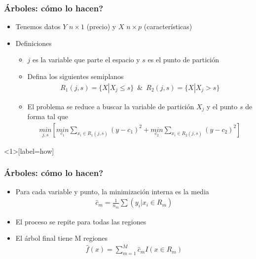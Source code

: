 \documentclass[
  shownotes,
  xcolor={svgnames},
  hyperref={colorlinks,citecolor=DarkBlue,linkcolor=DarkRed,urlcolor=DarkBlue}
  , aspectratio=169]{beamer}
\begin{document}
\begin{frame}[fragile]
\frametitle{Árboles: cómo lo hacen?}

\begin{itemize}
\item Tenemos datos $Y$ $n\times 1$ (precio) y $X$ $n\times p$ (características)
\item Definiciones
\begin{itemize}
\item $j$ es la variable que parte el espacio y  $s$ es el punto de partición
\item Defina los siguientes semiplanos
\begin{align}
R_1(j,s)=\{X|X_j\leq s\} \,\,\, \& \,\,\, R_2(j,s)=\{X|X_j > s\}
\end{align}
\item El problema se reduce a buscar la variable de partición $X_j$ y el punto $s$ de forma tal que 
\begin{align}
\underset{j,s}{min} \left[ \underset{c_1}{min}\sum_{x_i\in R_1(j,s)}(y-c_1)^2+ \underset{c_2}{min}\sum_{x_i\in R_2(j,s)}(y-c_2)^2\right]
\end{align}
\end{itemize}
\end{itemize}
\end{frame}
\begin{frame}<1>[label=how]
\frametitle{Árboles: cómo lo hacen?}

\begin{itemize}
\item Para cada variable y punto, la minimización interna es la media
\begin{align}
 \hat{c}_m =\frac{1}{n_m} \sum(y_i|x_i \in R_m)
\end{align}
\item El proceso se repite para todas las regiones
\pause
\item El árbol final tiene M regiones
\begin{align}
\hat{f}(x) = \sum_{m=1}^M \hat{c}_m I(x \in R_m)
\end{align}

\end{itemize}

\end{frame}
\end{document}
